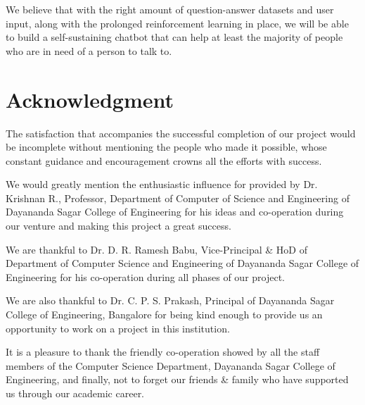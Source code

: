 \documentclass[conference,compsoc]{IEEEtran}
\begin{document}
We believe that with the right amount of question-answer datasets and user input, along with the prolonged reinforcement learning in place, we will be able to build a self-sustaining chatbot that can help at least the majority of people who are in need of a person to talk to.


\section{Acknowledgment}

The satisfaction that accompanies the successful completion of our project would be incomplete without mentioning the people who made it possible, whose constant guidance and encouragement crowns all the efforts with success.

We would greatly mention the enthusiastic influence for provided by Dr. Krishnan R., Professor, Department of Computer of Science and Engineering of Dayananda Sagar College of Engineering for his ideas and co-operation during our venture and making this project a great success.

We are thankful to Dr. D. R. Ramesh Babu, Vice-Principal \& HoD of Department of Computer Science and Engineering of Dayananda Sagar College of Engineering for his co-operation during all phases of our project.

We are also thankful to Dr. C. P. S. Prakash, Principal of Dayananda Sagar College of Engineering, Bangalore for being kind enough to provide us an opportunity to work on a project in this institution.

It is a pleasure to thank the friendly co-operation showed by all the staff members of the Computer Science Department, Dayananda Sagar College of Engineering, and finally, not to forget our friends \& family who have supported us through our academic career.

\printbibliography
\end{document}
